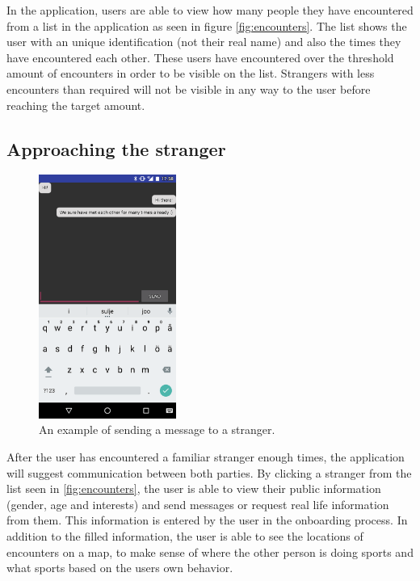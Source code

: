 In the application, users are able to view how many people they have encountered from a list in the application as seen in figure \ref{fig:encounters}. The list shows the user with an unique identification (not their real name) and also the times they have encountered each other. These users have encountered over the threshold amount of encounters in order to be visible on the list. Strangers with less encounters than required will not be visible in any way to the user before reaching the target amount.

\subsection{Approaching the stranger}

\begin{figure}[htb]
	\begin{center}
		\includegraphics[width=0.4\textwidth]{chat.png}
		\caption{An example of sending a message to a stranger.}
		\label{fig:fs_chat}
	\end{center}
\end{figure}

After the user has encountered a familiar stranger enough times, the application will suggest communication between both parties. By clicking a stranger from the list seen in \ref{fig:encounters}, the user is able to view their public information (gender, age and interests) and send messages or request real life information from them. This information is entered by the user in the onboarding process. In addition to the filled information, the user is able to see the locations of encounters on a map, to make sense of where the other person is doing sports and what sports based on the users own behavior.

